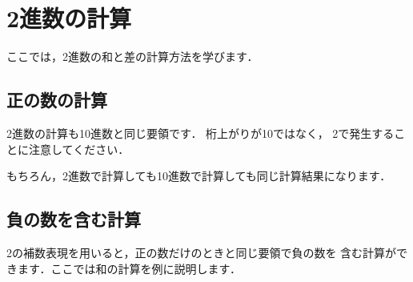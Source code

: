 
\section{2進数の計算}

ここでは，2進数の和と差の計算方法を学びます．

\subsection{正の数の計算}
2進数の計算も10進数と同じ要領です．
桁上がりが10ではなく，
2で発生することに注意してください．

もちろん，2進数で計算しても10進数で計算しても同じ計算結果になります．

\begin{center}
\end{center}

\subsection{負の数を含む計算}

2の補数表現を用いると，正の数だけのときと同じ要領で負の数を
含む計算ができます．ここでは和の計算を例に説明します．

